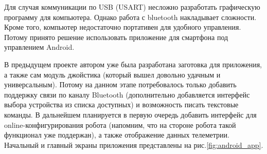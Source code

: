 \documentclass[14pt,a4paper,russian]{scrartcl}
\begin{document}
Для случая коммуникации по USB (USART) несложно разработать 
графическую программу для компьютера. Однако работа с bluetooth 
накладывает сложности. Кроме того, компьютер недостаточно
портативен для удобного управления. Потому принято решение использовать
приложение для смартфона под управлением Android.

В предыдущем проекте автором уже была разработана заготовка
для приложения, а также сам модуль джойстика (который вышел
довольно удачным и универсальным). Потому на данном этапе потребовалось
только добавить поддержку связи по каналу Bluetooth (дополнительно добавляется
интерфейс выбора устройства из списка доступных) и возможность писать
текстовые команды. В дальнейшем планируется в первую очередь
добавить интерфейс для online-конфигурирования робота (напомним, что
на стороне робота такой функционал уже поддержан), а также отображение 
данных телеметрии. Начальный и главный экраны приложения представлены
на рис.\ref{fig:android_app}.
\end{document}

